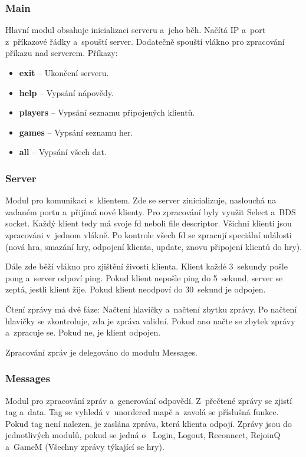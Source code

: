 \documentclass[12pt, a4paper]{article}
\begin{document}
\subsubsection{Main}
Hlavní modul obsahuje inicializaci serveru a~jeho běh.
Načítá IP a~port z~příkazové řádky a~spouští server.
Dodatečně spouští vlákno pro zpracování příkazu nad serverem.
Příkazy:
\begin{itemize}
    \item \textbf{exit} -- Ukončení serveru.
    \item \textbf{help} -- Vypsání nápovědy.
    \item \textbf{players} -- Vypsání seznamu připojených klientů.
    \item \textbf{games} -- Vypsání seznamu her.
    \item \textbf{all} -- Vypsání všech dat.
\end{itemize}

\subsubsection{Server}
Modul pro komunikaci s~klientem.
Zde se server zinicializuje, naslouchá na zadaném portu a~přijímá nové klienty.
Pro zpracování byly využit Select a~BDS socket.
Každý klient tedy má svoje fd neboli file descriptor.
Všichni klienti jsou zpracováni v~jednom vlákně.
Po kontrole všech fd se zpracují speciální události 
(nová hra, smazání hry, odpojení klienta, update, znovu připojení klientů do hry).

Dále zde běží vlákno pro zjištění živosti klienta.
Klient každé 3~sekundy pošle pong a~server odpoví ping.
Pokud klient nepošle ping do 5~sekund, server se zeptá, jestli klient žije.
Pokud klient neodpoví do 30~sekund je odpojen.

Čtení zprávy má dvě fáze:
Načtení hlavičky a~načtení zbytku zprávy.
Po načtení hlavičky se zkontroluje, zda je zpráva validní.
Pokud ano načte se zbytek zprávy a~zpracuje se.
Pokud ne, je klient odpojen.

Zpracování zpráv je delegováno do modulu Messages.

\subsubsection{Messages}
Modul pro zpracování zpráv a~generování odpovědí.
Z~přečtené zprávy se zjistí tag a~data.
Tag se vyhledá v~unordered mapě a~zavolá se příslušná funkce.
Pokud tag není nalezen, je zaslána zpráva, která klienta odpojí.
Zprávy jsou do jednotlivých modulů, pokud se jedná o~
Login, Logout, Reconnect, RejoinQ a~GameM (Všechny zprávy týkající se hry).
\end{document}
